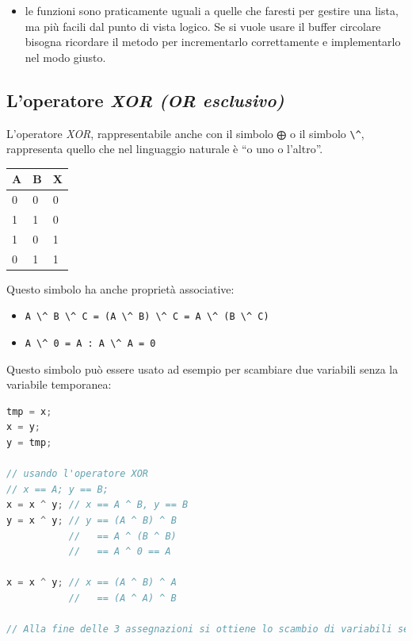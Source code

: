 \documentclass[
  paper=a4,
  oneside  ,captions=tableheading
]{scrbook}
\newcommand{\passthrough}[1]{#1}
\providecommand{\tightlist}{%
  \setlength{\itemsep}{0pt}\setlength{\parskip}{0pt}}
\begin{document}
\begin{itemize}
\tightlist
\item
  le funzioni sono praticamente uguali a quelle che faresti per gestire
  una lista, ma più facili dal punto di vista logico. Se si vuole usare
  il buffer circolare bisogna ricordare il metodo per incrementarlo
  correttamente e implementarlo nel modo giusto.
\end{itemize}

\hypertarget{loperatore-xor-or-esclusivo}{%
\subsection{\texorpdfstring{L'operatore \emph{XOR (OR
esclusivo)}}{L'operatore XOR (OR esclusivo)}}\label{loperatore-xor-or-esclusivo}}

L'operatore \emph{XOR}, rappresentabile anche con il simbolo
\passthrough{\lstinline!⨁!} o il simbolo \passthrough{\lstinline!\^!},
rappresenta quello che nel linguaggio naturale è ``o uno o l'altro''.

\begin{longtable}[]{@{}lll@{}}
\toprule
A & B & X\tabularnewline
\midrule
\endhead
0 & 0 & 0\tabularnewline
1 & 1 & 0\tabularnewline
1 & 0 & 1\tabularnewline
0 & 1 & 1\tabularnewline
\bottomrule
\end{longtable}

Questo simbolo ha anche proprietà associative:

\begin{itemize}
\item
  \passthrough{\lstinline!A \^ B \^ C = (A \^ B) \^ C = A \^ (B \^ C)!}
\item
  \passthrough{\lstinline!A \^ 0 = A : A \^ A = 0!}
\end{itemize}

Questo simbolo può essere usato ad esempio per scambiare due variabili
senza la variabile temporanea:

\begin{lstlisting}[language={C++}]
tmp = x;
x = y;
y = tmp;

// usando l'operatore XOR
// x == A; y == B;
x = x ^ y; // x == A ^ B, y == B
y = x ^ y; // y == (A ^ B) ^ B
           //   == A ^ (B ^ B)
           //   == A ^ 0 == A
           
x = x ^ y; // x == (A ^ B) ^ A 
           //   == (A ^ A) ^ B

// Alla fine delle 3 assegnazioni si ottiene lo scambio di variabili senza variabile tmp. Queste sono operazioni a livello di bit.
\end{lstlisting}
\end{document}
